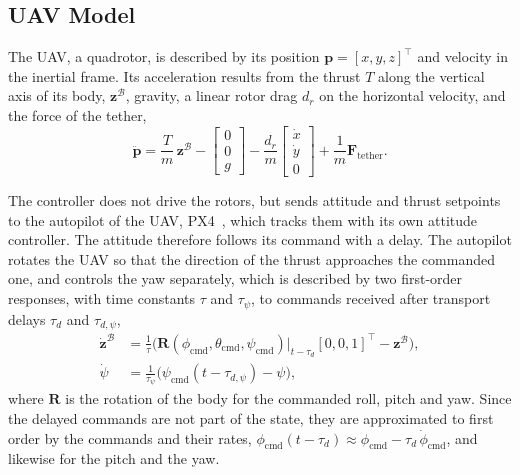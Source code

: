 \subsection{UAV Model}

The UAV, a quadrotor, is described by its position $\mathbf{p} = [x,y,z]^\top$ and velocity in the inertial frame. Its acceleration results from the thrust $T$ along the vertical axis of its body, $\mathbf{z}^{\mathcal{B}}$, gravity, a linear rotor drag $d_r$ on the horizontal velocity, and the force of the tether,
\begin{equation}
    \ddot{\mathbf{p}} = \frac{T}{m}\,\mathbf{z}^{\mathcal{B}} - \begin{bmatrix}0\\0\\g\end{bmatrix} - \frac{d_r}{m}\begin{bmatrix}\dot x\\ \dot y\\ 0\end{bmatrix} + \frac{1}{m}\mathbf{F}_{\mathrm{tether}}.
    \label{eq:uav_dyn}
\end{equation}

The controller does not drive the rotors, but sends attitude and thrust setpoints to the autopilot of the UAV, PX4~\cite{meier2015px4}, which tracks them with its own attitude controller. The attitude therefore follows its command with a delay. The autopilot rotates the UAV so that the direction of the thrust approaches the commanded one, and controls the yaw separately, which is described by two first-order responses, with time constants $\tau$ and $\tau_\psi$, to commands received after transport delays $\tau_d$ and $\tau_{d,\psi}$,
\begin{equation}
\begin{aligned}
    \dot{\mathbf{z}}^{\mathcal{B}} &= \tfrac{1}{\tau}\big(\mathbf{R}(\phi_{\mathrm{cmd}},\theta_{\mathrm{cmd}},\psi_{\mathrm{cmd}})\big|_{t-\tau_d}[0,0,1]^\top - \mathbf{z}^{\mathcal{B}}\big), \\
    \dot\psi &= \tfrac{1}{\tau_\psi}\big(\psi_{\mathrm{cmd}}(t-\tau_{d,\psi}) - \psi\big),
\end{aligned}
\label{eq:uav_att}
\end{equation}
where $\mathbf{R}$ is the rotation of the body for the commanded roll, pitch and yaw. Since the delayed commands are not part of the state, they are approximated to first order by the commands and their rates, $\phi_{\mathrm{cmd}}(t-\tau_d) \approx \phi_{\mathrm{cmd}} - \tau_d\,\dot\phi_{\mathrm{cmd}}$, and likewise for the pitch and the yaw.

